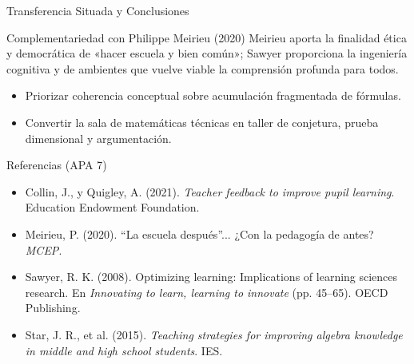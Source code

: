 \documentclass[aspectratio=169,spanish,xcolor=table]{beamer}
\begin{document}
\begin{frame}{Transferencia Situada y Conclusiones}
  \begin{block}{Complementariedad con Philippe Meirieu (2020)}
    Meirieu aporta la finalidad ética y democrática de «hacer escuela y bien común»; Sawyer proporciona la ingeniería cognitiva y de ambientes que vuelve viable la comprensión profunda para todos.
  \end{block}
  \vspace{0.25cm}
  \begin{itemize}\normalsize
    \item Priorizar coherencia conceptual sobre acumulación fragmentada de fórmulas.
    \item Convertir la sala de matemáticas técnicas en taller de conjetura, prueba dimensional y argumentación.
  \end{itemize}
\end{frame}

\begin{frame}{Referencias (APA 7)}
  \scriptsize\setlength{\parskip}{5pt}
  \begin{itemize}
    \item Collin, J., y Quigley, A. (2021). \textit{Teacher feedback to improve pupil learning}. Education Endowment Foundation.
    \item Meirieu, P. (2020). ``La escuela después''... ¿Con la pedagogía de antes? \textit{MCEP}.
    \item Sawyer, R. K. (2008). Optimizing learning: Implications of learning sciences research. En \textit{Innovating to learn, learning to innovate} (pp. 45--65). OECD Publishing.
    \item Star, J. R., et al. (2015). \textit{Teaching strategies for improving algebra knowledge in middle and high school students}. IES.
  \end{itemize}
\end{frame}
\end{document}
